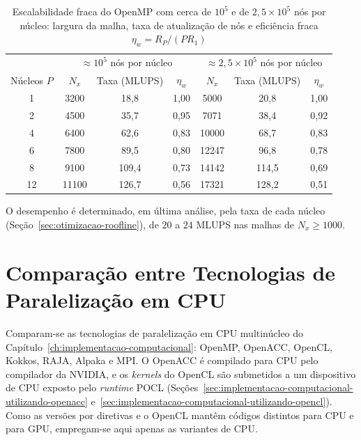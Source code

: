 \begin{table}[H]
    \centering
    \caption{Escalabilidade fraca do OpenMP com cerca de \(10^5\) e de \(2{,}5\times10^5\) nós por núcleo: largura da malha, taxa de atualização de nós e eficiência fraca \(\eta_w = R_P/(P R_1)\)}
    \label{tab:escalabilidade-fraca}
    \footnotesize
    \begin{tabular}{c|ccc|ccc}
        \toprule
         & \multicolumn{3}{c|}{\(\approx 10^5\) nós por núcleo} & \multicolumn{3}{c}{\(\approx 2{,}5\times10^5\) nós por núcleo} \\
        Núcleos \(P\) & \(N_x\) & Taxa (MLUPS) & \(\eta_w\) & \(N_x\) & Taxa (MLUPS) & \(\eta_w\) \\
        \midrule
        1 & 3200 & 18{,}8 & 1{,}00 & 5000 & 20{,}8 & 1{,}00 \\
        2 & 4500 & 35{,}7 & 0{,}95 & 7071 & 38{,}4 & 0{,}92 \\
        4 & 6400 & 62{,}6 & 0{,}83 & 10000 & 68{,}7 & 0{,}83 \\
        6 & 7800 & 89{,}5 & 0{,}80 & 12247 & 96{,}8 & 0{,}78 \\
        8 & 9100 & 109{,}4 & 0{,}73 & 14142 & 114{,}5 & 0{,}69 \\
        12 & 11100 & 126{,}7 & 0{,}56 & 17321 & 128{,}2 & 0{,}51 \\
        \bottomrule
    \end{tabular}
\end{table}

O desempenho é determinado, em última análise, pela taxa de cada núcleo (Seção~\ref{sec:otimizacao-roofline}), de \(20\) a \(24\) MLUPS nas malhas de \(N_x \geq 1000\).


\section{Comparação entre Tecnologias de Paralelização em CPU}\label{sec:comparacao-de-tecnologias-em-cpu}

Comparam-se as tecnologias de paralelização em CPU multinúcleo do Capítulo~\ref{ch:implementacao-computacional}: OpenMP, OpenACC, OpenCL, Kokkos, RAJA, Alpaka e MPI.
O OpenACC é compilado para CPU pelo compilador da NVIDIA, e os \textit{kernels} do OpenCL são submetidos a um dispositivo de CPU exposto pelo \textit{runtime} POCL (Seções~\ref{sec:implementacao-computacional-utilizando-openacc} e~\ref{sec:implementacao-computacional-utilizando-opencl}).
Como as versões por diretivas e o OpenCL mantêm códigos distintos para CPU e para GPU, empregam-se aqui apenas as variantes de CPU.

